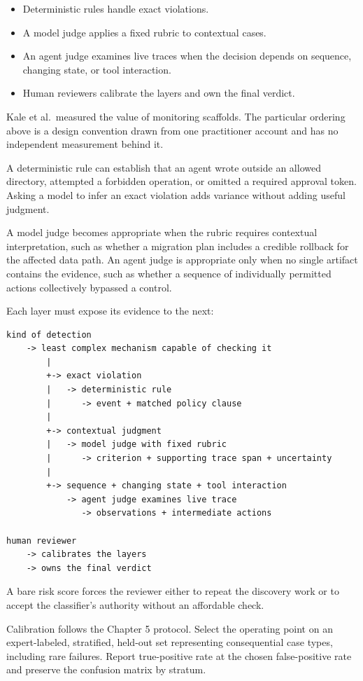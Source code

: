\begin{itemize}
\tightlist
\item
  Deterministic rules handle exact violations.
\item
  A model judge applies a fixed rubric to contextual cases.
\item
  An agent judge examines live traces when the decision depends on sequence, changing state, or tool interaction.
\item
  Human reviewers calibrate the layers and own the final verdict.
\end{itemize}

Kale et al.~measured the value of monitoring scaffolds. The particular ordering above is a design convention drawn from one practitioner account and has no independent measurement behind it.

A deterministic rule can establish that an agent wrote outside an allowed directory, attempted a forbidden operation, or omitted a required approval token. Asking a model to infer an exact violation adds variance without adding useful judgment.

A model judge becomes appropriate when the rubric requires contextual interpretation, such as whether a migration plan includes a credible rollback for the affected data path. An agent judge is appropriate only when no single artifact contains the evidence, such as whether a sequence of individually permitted actions collectively bypassed a control.

Each layer must expose its evidence to the next:

\begin{verbatim}
kind of detection
    -> least complex mechanism capable of checking it
        |
        +-> exact violation
        |   -> deterministic rule
        |      -> event + matched policy clause
        |
        +-> contextual judgment
        |   -> model judge with fixed rubric
        |      -> criterion + supporting trace span + uncertainty
        |
        +-> sequence + changing state + tool interaction
            -> agent judge examines live trace
               -> observations + intermediate actions

human reviewer
    -> calibrates the layers
    -> owns the final verdict
\end{verbatim}

A bare risk score forces the reviewer either to repeat the discovery work or to accept the classifier's authority without an affordable check.

Calibration follows the Chapter 5 protocol. Select the operating point on an expert-labeled, stratified, held-out set representing consequential case types, including rare failures. Report true-positive rate at the chosen false-positive rate and preserve the confusion matrix by stratum.


